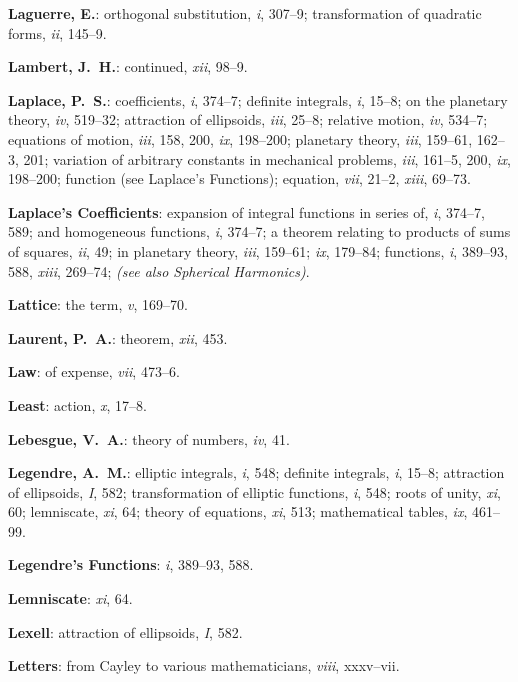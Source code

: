 \documentclass[11pt,a4paper]{article}
\newcommand{\IndexEntry}[1]{\textbf{#1}}
\newcommand{\SeeAlso}[1]{\textit{(see also #1)}}
\newcommand{\V}[1]{\textit{#1}} %
\begin{document}
\IndexEntry{Laguerre, E.}: orthogonal substitution, \V{i}, 307--9; transformation of quadratic forms, \V{ii}, 145--9.

\IndexEntry{Lambert, J.\ H.}: continued, \V{xii}, 98--9.

\IndexEntry{Laplace, P.\ S.}: coefficients, \V{i}, 374--7; definite integrals, \V{i}, 15--8; on the planetary theory, \V{iv}, 519--32; attraction of ellipsoids, \V{iii}, 25--8; relative motion, \V{iv}, 534--7; equations of motion, \V{iii}, 158, 200, \V{ix}, 198--200; planetary theory, \V{iii}, 159--61, 162--3, 201; variation of arbitrary constants in mechanical problems, \V{iii}, 161--5, 200, \V{ix}, 198--200; function (see Laplace's Functions); equation, \V{vii}, 21--2, \V{xiii}, 69--73.

\IndexEntry{Laplace's Coefficients}: expansion of integral functions in series of, \V{i}, 374--7, 589; and homogeneous functions, \V{i}, 374--7; a theorem relating to products of sums of squares, \V{ii}, 49; in planetary theory, \V{iii}, 159--61; \V{ix}, 179--84; functions, \V{i}, 389--93, 588, \V{xiii}, 269--74; \SeeAlso{Spherical Harmonics}.

\IndexEntry{Lattice}: the term, \V{v}, 169--70.

\IndexEntry{Laurent, P.\ A.}: theorem, \V{xii}, 453.

\IndexEntry{Law}: of expense, \V{vii}, 473--6.

\IndexEntry{Least}: action, \V{x}, 17--8.

\IndexEntry{Lebesgue, V.\ A.}: theory of numbers, \V{iv}, 41.

\IndexEntry{Legendre, A.\ M.}: elliptic integrals, \V{i}, 548; definite integrals, \V{i}, 15--8; attraction of ellipsoids, \V{I}, 582; transformation of elliptic functions, \V{i}, 548; roots of unity, \V{xi}, 60; lemniscate, \V{xi}, 64; theory of equations, \V{xi}, 513; mathematical tables, \V{ix}, 461--99.

\IndexEntry{Legendre's Functions}: \V{i}, 389--93, 588.

\IndexEntry{Lemniscate}: \V{xi}, 64.

\IndexEntry{Lexell}: attraction of ellipsoids, \V{I}, 582.

\IndexEntry{Letters}: from Cayley to various mathematicians, \V{viii}, xxxv--vii.

\newpage

\setcounter{page}{109}
\end{document}
